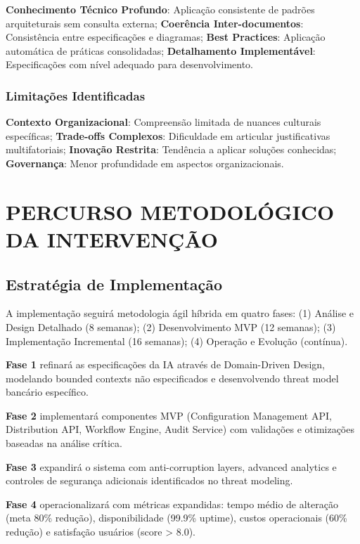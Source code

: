 \textbf{Conhecimento Técnico Profundo}: Aplicação consistente de padrões arquiteturais sem consulta externa; \textbf{Coerência Inter-documentos}: Consistência entre especificações e diagramas; \textbf{Best Practices}: Aplicação automática de práticas consolidadas; \textbf{Detalhamento Implementável}: Especificações com nível adequado para desenvolvimento.

\subsection{Limitações Identificadas}

\textbf{Contexto Organizacional}: Compreensão limitada de nuances culturais específicas; \textbf{Trade-offs Complexos}: Dificuldade em articular justificativas multifatoriais; \textbf{Inovação Restrita}: Tendência a aplicar soluções conhecidas; \textbf{Governança}: Menor profundidade em aspectos organizacionais.

\chapter{PERCURSO METODOLÓGICO DA INTERVENÇÃO}

\section{Estratégia de Implementação}

A implementação seguirá metodologia ágil híbrida em quatro fases: (1) Análise e Design Detalhado (8 semanas); (2) Desenvolvimento MVP (12 semanas); (3) Implementação Incremental (16 semanas); (4) Operação e Evolução (contínua).

\textbf{Fase 1} refinará as especificações da IA através de Domain-Driven Design, modelando bounded contexts não especificados e desenvolvendo threat model bancário específico.

\textbf{Fase 2} implementará componentes MVP (Configuration Management API, Distribution API, Workflow Engine, Audit Service) com validações e otimizações baseadas na análise crítica.

\textbf{Fase 3} expandirá o sistema com anti-corruption layers, advanced analytics e controles de segurança adicionais identificados no threat modeling.

\textbf{Fase 4} operacionalizará com métricas expandidas: tempo médio de alteração (meta 80\% redução), disponibilidade (99.9\% uptime), custos operacionais (60\% redução) e satisfação usuários (score > 8.0).

